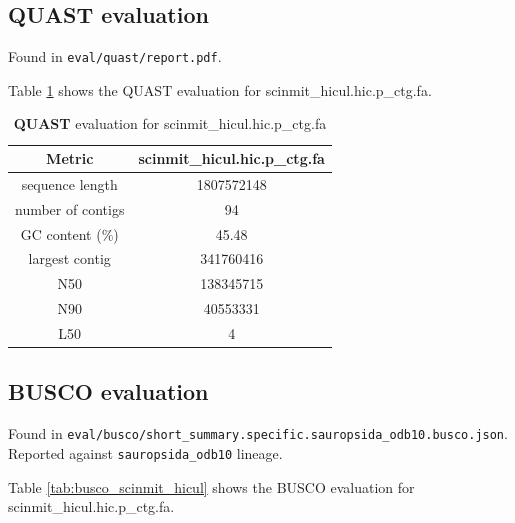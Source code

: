 \documentclass[12pt]{article}
\begin{document}
\subsection{QUAST evaluation}

Found in \texttt{eval/quast/report.pdf}. 

Table \ref{tab:quast_scinmit_hicul} shows the QUAST evaluation for scinmit\_hicul.hic.p\_ctg.fa.

\begin{table}[h!]
    \begin{center}
    \begin{tabular}{ |c|c| }
        \hline
        Metric & scinmit\_hicul.hic.p\_ctg.fa \\
        \hline
        sequence length & 1807572148 \\
        number of contigs & 94 \\
        GC content (\%) & 45.48 \\
        largest contig & 341760416 \\
        N50 & 138345715 \\
        N90 & 40553331 \\
        L50 & 4 \\
        \hline
    \end{tabular}
    \caption{\textbf{QUAST} evaluation for scinmit\_hicul.hic.p\_ctg.fa}
    \label{tab:quast_scinmit_hicul}
    \end{center}
    \end{table}

\subsection{BUSCO evaluation}

Found in \texttt{eval/busco/short\_summary.specific.sauropsida\_odb10.busco.json}. Reported against \texttt{sauropsida\_odb10} lineage.

Table \ref{tab:busco_scinmit_hicul} shows the BUSCO evaluation for scinmit\_hicul.hic.p\_ctg.fa.
\end{document}
